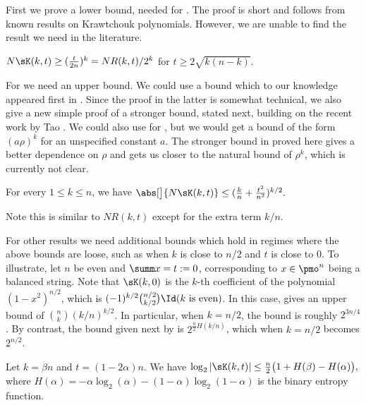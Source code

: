 First we prove a lower bound, needed for .  The proof is short and follows from known results on Krawtchouk polynomials.  However, we are unable to find the result we need in the literature.
\begin{claim} \label{claim:sK-lb}
  $N \sK(k,t) \ge (\frac{t}{2n})^k = NR(k,t)/2^k$ for $t \ge 2\sqrt{k(n-k)}$.
\end{claim}

For  we need an upper bound.  We could use a bound which to our knowledge appeared first in \cite{BIJLSV21}. Since the proof in the latter is somewhat technical, we also give a new simple proof of a stronger bound, stated next, building on the recent work by Tao \cite{Tao23-Maclaurin}.  We could also use \cite{BIJLSV21} for , but we would get a bound of the form $(a\rho)^k$ for an unspecified constant $a$.  The stronger bound in  proved here gives a better dependence on $\rho$ and gets us closer to the natural bound of $\rho^k$, which is currently not clear.

\begin{corollary} \label{cor:bijlsv-ineq}
For every $1 \le k \le n$, we have $
    \abs[\big]{N\sK(k,t)}
    \le ( \frac{k}{n} + \frac{t^2}{n^2} )^{k/2}.$
\end{corollary}

Note this is similar to $NR(k,t)$ except for the extra term $k/n$.

For other results we need additional bounds which hold in regimes where the above bounds are loose, such as when $k$ is close to $n/2$ and $t$ is close to $0$.  To illustrate, let $n$ be even and $\summ x = t := 0$, corresponding to $x \in \pmo^n$ being a balanced string.  Note that $\sK(k,0)$ is the $k$-th coefficient of the polynomial $(1-x^2)^{n/2}$, which is $(-1)^{k/2} \binom{n/2}{k/2} \Id(\text{$k$ is even})$.
In this case,  gives an upper bound of $\binom{n}{k} (k/n)^{k/2}$.  In particular, when $k = n/2$, the bound is roughly $2^{3n/4}$.
By contrast, the bound given next by  is $2^{\frac{n}{2}H(k/n)}$, which when $k = n/2$ becomes $2^{n/2}$.

\begin{proposition} \label{prop:Harm-bound-H}
Let $k = \beta n$ and $t=(1-2\alpha) n$.
We have
$\log_2|\sK(k,t)| \leq \frac{n}{2} \bigl( 1 + H(\beta) - H(\alpha) \bigr),
$ where $H(\alpha)=-\alpha\log_2(\alpha)-(1-\alpha)\log_2(1-\alpha)$ is the binary entropy function.
\end{proposition}

